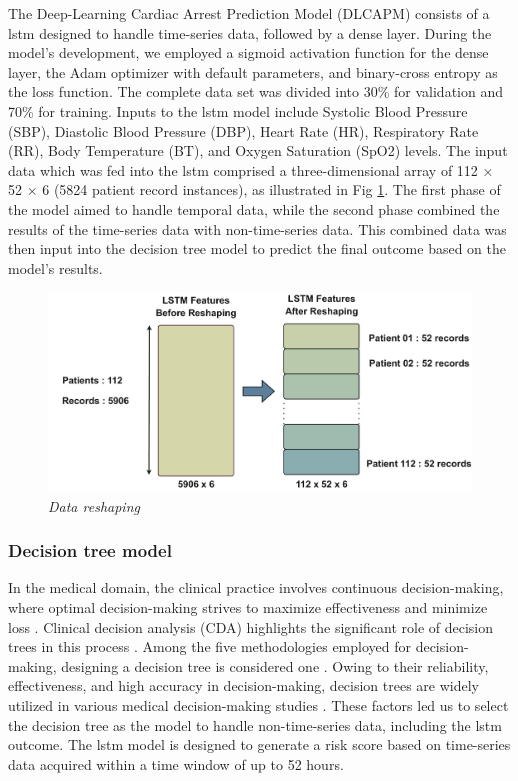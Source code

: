 \documentclass[journal,article,submit,pdftex,moreauthors]{Definitions/mdpi}
\begin{document}
The Deep-Learning Cardiac Arrest Prediction Model (DLCAPM) consists of a \gls{lstm} designed to handle time-series data, followed by a dense layer. During the model's development, we employed a sigmoid activation function for the dense layer, the Adam optimizer with default parameters, and binary-cross entropy as the loss function. The complete data set was divided into 30\% for validation and 70\% for training. Inputs to the \gls{lstm} model include Systolic Blood Pressure (SBP), Diastolic Blood Pressure (DBP), Heart Rate (HR), Respiratory Rate (RR), Body Temperature (BT), and Oxygen Saturation (SpO2) levels. The input data which was fed into the \gls{lstm} comprised a three-dimensional array of 112 × 52 × 6 (5824 patient record instances), as illustrated in Fig \ref{fig:figure5}. The first phase of the model aimed to handle temporal data, while the second phase combined the results of the time-series data with non-time-series data. This combined data was then input into the decision tree model to predict the final outcome based on the model's results.

\begin{figure}[hbt!]
    \centering
    \includegraphics[width=0.7\linewidth]{images/dataReshaping.pdf}
    \caption{\textit{Data reshaping}}
    \label{fig:figure5}
    \vspace{-10pt}
\end{figure}


\subsubsection{Decision tree model}

In the medical domain, the clinical practice involves continuous decision-making, where optimal decision-making strives to maximize effectiveness and minimize loss \cite{b18}. Clinical decision analysis (CDA) highlights the significant role of decision trees in this process \cite{b19}. Among the five methodologies employed for decision-making, designing a decision tree is considered one \cite{b20}. Owing to their reliability, effectiveness, and high accuracy in decision-making, decision trees are widely utilized in various medical decision-making studies \cite{b21}. These factors led us to select the decision tree as the model to handle non-time-series data, including the \gls{lstm} outcome. The \gls{lstm} model is designed to generate a risk score based on time-series data acquired within a time window of up to 52 hours.
\end{document}
